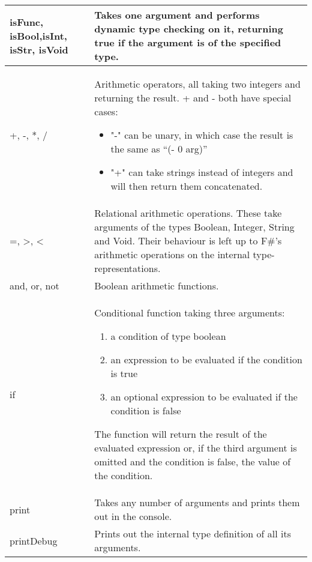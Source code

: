 \documentclass[11pt]{article}
\begin{document}
        \begin{tabularx}{\textwidth} { | >{\raggedright\arraybackslash}p{3cm} | >{\raggedright\arraybackslash}X | }
            \hline
            isFunc, isBool,\newline isInt, isStr, isVoid &
            Takes one argument and performs dynamic type checking on it, returning true if the argument is of the specified type. \\
            \hline
            +, -, *, / &
            Arithmetic operators, all taking two integers and returning the result. + and - both have special cases:
            \begin{itemize}
                \item "-" can be unary, in which case the result is the same as “(- 0 arg)”
                \item "+" can take strings instead of integers and will then return them concatenated.
            \end{itemize} \\
            \hline
            =, \textgreater, \textless &
            Relational arithmetic operations. These take arguments of the types Boolean, Integer, String and Void. Their behaviour is left up
            to F\#’s arithmetic operations on the internal type-representations. \\
            \hline
            and, or, not &
            Boolean arithmetic functions.\\
            \hline
            if &
            Conditional function taking three arguments:
            \begin{enumerate}
                \item a condition of type boolean
                \item an expression to be evaluated if the condition is true
                \item an optional expression to be evaluated if the condition is false
            \end{enumerate}
            The function will return the result of the evaluated expression or, if the third argument is omitted and the condition is false,
            the value of the condition.\\
            \hline
            print &
            Takes any number of arguments and prints them out in the console.\\
            \hline
            printDebug &
            Prints out the internal type definition of all its arguments.\\

\end{tabularx}
\end{document}
